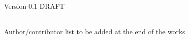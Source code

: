 
\thispagestyle{empty}%
{\noindent Version 0.1 DRAFT}
\vspace*{\fill}
\begin{fullwidth}
\sffamily
{
  \huge
  \smallcaps
  \@title
}\\
\vspace{4\baselineskip}
{\Large 
\noindent
% 
Author/contributor list to be added at the end of the works
}\\
\vspace{4\baselineskip}
\noindent
\@date\\
\vspace{\baselineskip}
\end{fullwidth}
\vspace*{\fill}
